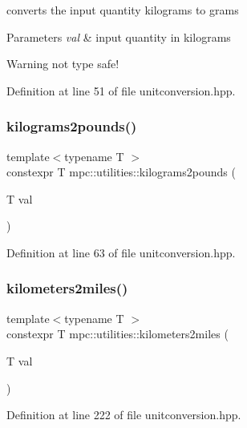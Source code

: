 converts the input quantity kilograms to grams 


\begin{DoxyParams}{Parameters}
{\em val} & input quantity in kilograms\\
\hline
\end{DoxyParams}
\begin{DoxyWarning}{Warning}
not type safe! 
\end{DoxyWarning}


Definition at line 51 of file unitconversion.\+hpp.

\mbox{\label{namespacempc_1_1utilities_a2aba7ace8ddd90e43d4532cc3decc7d3}} 
\subsubsection{\texorpdfstring{kilograms2pounds()}{kilograms2pounds()}}
{\footnotesize\ttfamily template$<$typename T $>$ \\
constexpr T mpc\+::utilities\+::kilograms2pounds (\begin{DoxyParamCaption}\item[{T}]{val }\end{DoxyParamCaption})}



Definition at line 63 of file unitconversion.\+hpp.

\mbox{\label{namespacempc_1_1utilities_a7fca77ca1465be0d44ed1a8e003a4b6e}} 
\subsubsection{\texorpdfstring{kilometers2miles()}{kilometers2miles()}}
{\footnotesize\ttfamily template$<$typename T $>$ \\
constexpr T mpc\+::utilities\+::kilometers2miles (\begin{DoxyParamCaption}\item[{T}]{val }\end{DoxyParamCaption})}



Definition at line 222 of file unitconversion.\+hpp.

